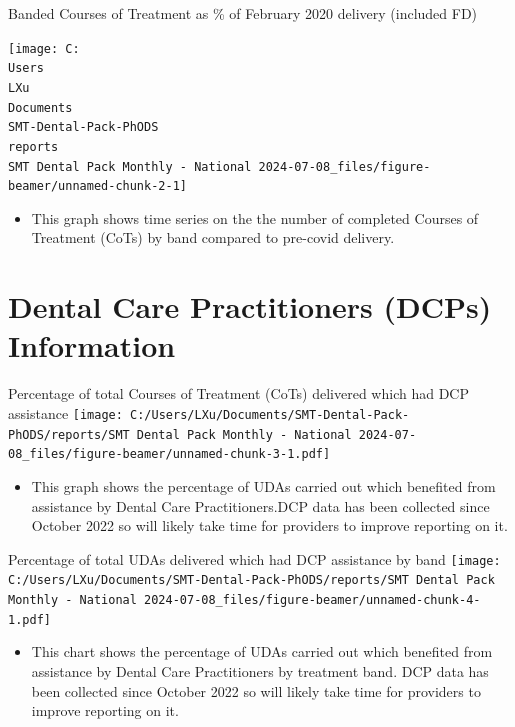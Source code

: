 \documentclass[
  8pt,
  ignorenonframetext,
  aspectratio = 169]{beamer}
\providecommand{\tightlist}{%
  \setlength{\itemsep}{0pt}\setlength{\parskip}{0pt}}
\begin{document}
\begin{frame}{Banded Courses of Treatment as \% of February 2020
delivery (included FD)}
\protect\hypertarget{banded-courses-of-treatment-as-of-february-2020-delivery-included-fd}{}
\begin{center}\texttt{[image: C:\\Users\\LXu\\Documents\\SMT-Dental-Pack-PhODS\\reports\\SMT Dental Pack Monthly - National 2024-07-08\_files/figure-beamer/unnamed-chunk-2-1]} \end{center}

\begin{itemize}
\tightlist
\item
  This graph shows time series on the the number of completed Courses of
  Treatment (CoTs) by band compared to pre-covid delivery.
\end{itemize}
\end{frame}

\hypertarget{dental-care-practitioners-dcps-information}{%
\section{Dental Care Practitioners (DCPs)
Information}\label{dental-care-practitioners-dcps-information}}

\begin{frame}{Percentage of total Courses of Treatment (CoTs) delivered
which had DCP assistance}
\protect\hypertarget{percentage-of-total-courses-of-treatment-cots-delivered-which-had-dcp-assistance}{}
\texttt{[image: C:/Users/LXu/Documents/SMT-Dental-Pack-PhODS/reports/SMT Dental Pack Monthly - National 2024-07-08\_files/figure-beamer/unnamed-chunk-3-1.pdf]}

\begin{itemize}
\tightlist
\item
  This graph shows the percentage of UDAs carried out which benefited
  from assistance by Dental Care Practitioners.DCP data has been
  collected since October 2022 so will likely take time for providers to
  improve reporting on it.
\end{itemize}
\end{frame}

\begin{frame}{Percentage of total UDAs delivered which had DCP
assistance by band}
\protect\hypertarget{percentage-of-total-udas-delivered-which-had-dcp-assistance-by-band}{}
\texttt{[image: C:/Users/LXu/Documents/SMT-Dental-Pack-PhODS/reports/SMT Dental Pack Monthly - National 2024-07-08\_files/figure-beamer/unnamed-chunk-4-1.pdf]}

\begin{itemize}
\tightlist
\item
  This chart shows the percentage of UDAs carried out which benefited
  from assistance by Dental Care Practitioners by treatment band. DCP
  data has been collected since October 2022 so will likely take time
  for providers to improve reporting on it.
\end{itemize}
\end{frame}
\end{document}
